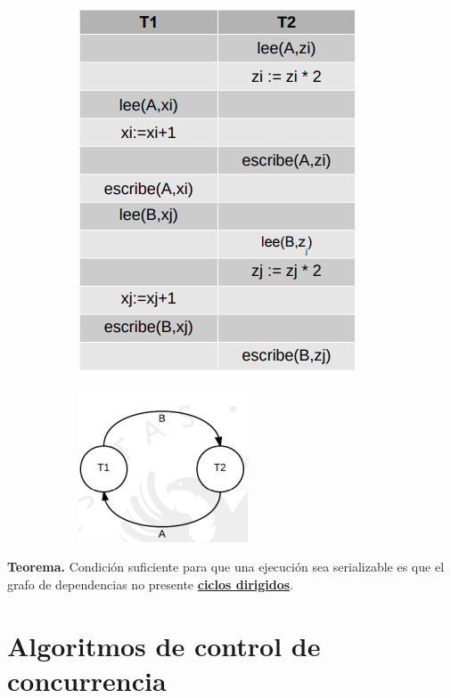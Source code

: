 \begin{figure}[H]
\centering
\begin{subfigure}{.5\textwidth}
  \centering
  \includegraphics[width=.7\linewidth]{img/39.png}
\end{subfigure}%
\begin{subfigure}{.6\textwidth}
  \centering
  \includegraphics[width=.4\linewidth]{img/40.png}
\end{subfigure}
\end{figure}

\textbf{Teorema.} Condición suficiente para que una ejecución sea serializable es que el grafo de dependencias no presente \underline{\textbf{ciclos dirigidos}}.

\section{Algoritmos de control de concurrencia}

